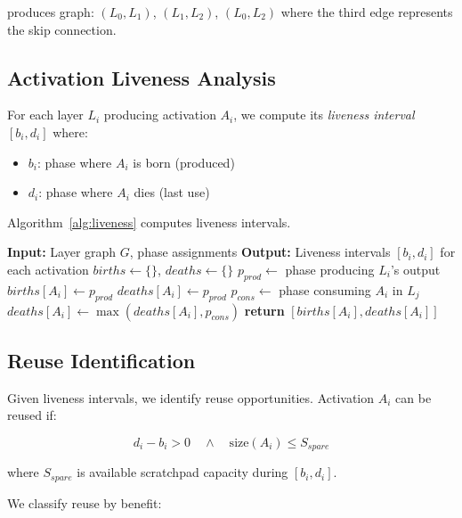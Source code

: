 \documentclass[journal]{IEEEtran}
\begin{document}
produces graph: $(L_0, L_1)$, $(L_1, L_2)$, $(L_0, L_2)$ where the third edge represents the skip connection.

\subsection{Activation Liveness Analysis}

For each layer $L_i$ producing activation $A_i$, we compute its \textit{liveness interval} $[b_i, d_i]$ where:
\begin{itemize}
\item $b_i$: phase where $A_i$ is born (produced)
\item $d_i$: phase where $A_i$ dies (last use)
\end{itemize}

Algorithm~\ref{alg:liveness} computes liveness intervals.

\begin{algorithm}[t]
\caption{Activation Liveness Analysis}
\label{alg:liveness}
\begin{algorithmic}[1]
\STATE \textbf{Input:} Layer graph $G$, phase assignments
\STATE \textbf{Output:} Liveness intervals $[b_i, d_i]$ for each activation
\STATE $births \gets \{\}$, $deaths \gets \{\}$
  \STATE $p_{prod} \gets $ phase producing $L_i$'s output
  \STATE $births[A_i] \gets p_{prod}$
  \STATE $deaths[A_i] \gets p_{prod}$  
\ENDFOR
{}
  \STATE $p_{cons} \gets $ phase consuming $A_i$ in $L_j$
  \STATE $deaths[A_i] \gets \max(deaths[A_i], p_{cons})$
\ENDFOR
{}
  \STATE \textbf{return} $[births[A_i], deaths[A_i]]$
\ENDFOR
\end{algorithmic}
\end{algorithm}

\subsection{Reuse Identification}

Given liveness intervals, we identify reuse opportunities. Activation $A_i$ can be reused if:

\begin{equation}
d_i - b_i > 0 \quad \wedge \quad \text{size}(A_i) \leq S_{spare}
\end{equation}

where $S_{spare}$ is available scratchpad capacity during $[b_i, d_i]$.

We classify reuse by benefit:
\end{document}
